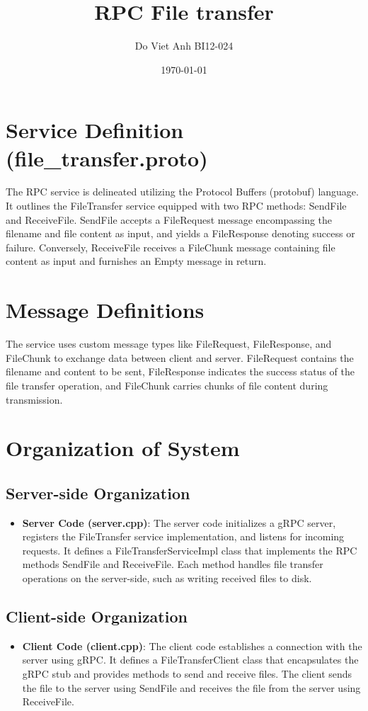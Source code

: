 \documentclass{article}
\title{RPC File transfer}
\author{Do Viet Anh BI12-024}
\date{\today}
\begin{document}
\maketitle

\section{Service Definition (file\_transfer.proto)}
The RPC service is delineated utilizing the Protocol Buffers (protobuf) language. It outlines the FileTransfer service equipped with two RPC methods: SendFile and ReceiveFile. SendFile accepts a FileRequest message encompassing the filename and file content as input, and yields a FileResponse denoting success or failure. Conversely, ReceiveFile receives a FileChunk message containing file content as input and furnishes an Empty message in return.

\section{Message Definitions}
The service uses custom message types like FileRequest, FileResponse, and FileChunk to exchange data between client and server. FileRequest contains the filename and content to be sent, FileResponse indicates the success status of the file transfer operation, and FileChunk carries chunks of file content during transmission.

\section{Organization of System}

\subsection{Server-side Organization}
\begin{itemize}
    \item \textbf{Server Code (server.cpp)}: The server code initializes a gRPC server, registers the FileTransfer service implementation, and listens for incoming requests. It defines a FileTransferServiceImpl class that implements the RPC methods SendFile and ReceiveFile. Each method handles file transfer operations on the server-side, such as writing received files to disk.
\end{itemize}

\subsection{Client-side Organization}
\begin{itemize}
    \item \textbf{Client Code (client.cpp)}: The client code establishes a connection with the server using gRPC. It defines a FileTransferClient class that encapsulates the gRPC stub and provides methods to send and receive files. The client sends the file to the server using SendFile and receives the file from the server using ReceiveFile.
\end{itemize}
\end{document}
